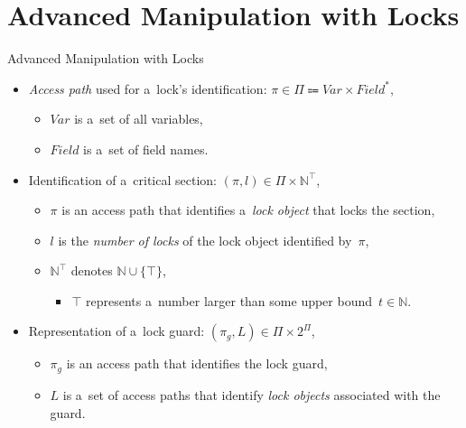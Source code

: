 \documentclass[10pt, xcolor=pdflatex, hyperref={unicode}, aspectratio=169]{beamer}
\begin{document}
\section{Advanced Manipulation with Locks}
\begin{frame}{Advanced Manipulation with Locks}
    \begin{itemize}\setlength\itemsep{1.5em}
        \item \emph{Access path} used for a~\alert{lock's identification}: $ \pi \in \Pi \Coloneqq Var \times Field^* $,
            \smallskip
            \begin{itemize}\setlength\itemsep{.8em}
                \item $ Var $ is a~set of all variables,

                \item $ Field $ is a~set of field names.
            \end{itemize}

        \item Identification of a~\alert{critical section}: $ (\pi, l) \in \Pi \times \mathbb{N}^\top $,
            \smallskip
            \begin{itemize}\setlength\itemsep{.8em}
                \item $ \pi $ is an access path that identifies a~\emph{lock object} that locks the section,

                \item $ l $ is the \emph{number of locks} of the lock object identified by~$ \pi $,

                \item $ \mathbb{N}^\top $ denotes $ \mathbb{N} \cup \{\top\} $,
                    \smallskip
                    \begin{itemize}
                        \item $ \top $ represents a~number larger than some \alert{upper bound}~$ t \in \mathbb{N} $.
                    \end{itemize}
            \end{itemize}

        \item Representation of a~\alert{lock guard}: $ (\pi_g, L) \in \Pi \times 2^\Pi $,
            \smallskip
            \begin{itemize}\setlength\itemsep{.8em}
                \item $ \pi_g $ is an access path that identifies the lock guard,

                \item $ L $ is a~set of access paths that identify \emph{lock objects} associated with the guard.
            \end{itemize}
    \end{itemize}
\end{frame}
\end{document}
